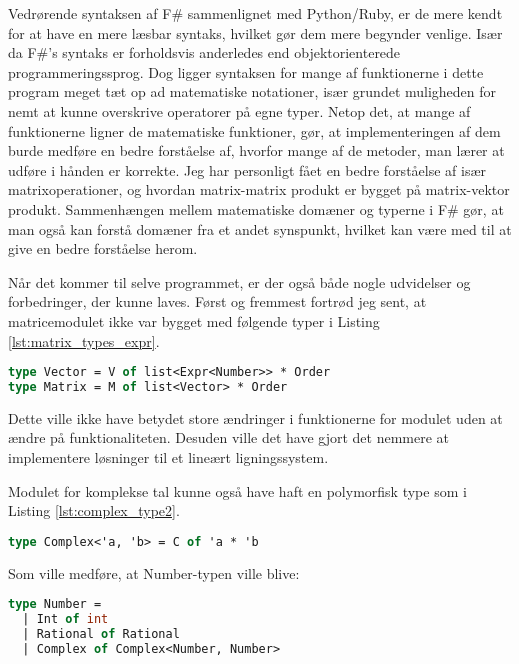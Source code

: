 \documentclass{article}
\begin{document}
Vedrørende syntaksen af F\# sammenlignet med Python/Ruby, er de mere kendt for at have en mere læsbar syntaks, hvilket gør dem mere begynder venlige. Især da F\#'s syntaks er forholdsvis anderledes end objektorienterede programmeringssprog. Dog ligger syntaksen for mange af funktionerne i dette program meget tæt op ad matematiske notationer, især grundet muligheden for nemt at kunne overskrive operatorer på egne typer. Netop det, at mange af funktionerne ligner de matematiske funktioner, gør, at implementeringen af dem burde medføre en bedre forståelse af, hvorfor mange af de metoder, man lærer at udføre i hånden er korrekte. Jeg har personligt fået en bedre forståelse af især matrixoperationer, og hvordan matrix-matrix produkt er bygget på matrix-vektor produkt. Sammenhængen mellem matematiske domæner og typerne i F\# gør, at man også kan forstå domæner fra et andet synspunkt, hvilket kan være med til at give en bedre forståelse herom.

Når det kommer til selve programmet, er der også både nogle udvidelser og forbedringer, der kunne laves. Først og fremmest fortrød jeg sent, at matricemodulet ikke var bygget med følgende typer i Listing \ref{lst:matrix_types_expr}.

\begin{lstlisting}[language={FSharp}, label={lst:matrix_types_expr}, caption={Eksempel på alternative typer for matrixmodulet}]
type Vector = V of list<Expr<Number>> * Order
type Matrix = M of list<Vector> * Order
\end{lstlisting}

Dette ville ikke have betydet store ændringer i funktionerne for modulet uden at ændre på funktionaliteten. Desuden ville det have gjort det nemmere at implementere løsninger til et lineært ligningssystem.

Modulet for komplekse tal kunne også have haft en polymorfisk type som i Listing \ref{lst:complex_type2}.

\begin{lstlisting}[language={FSharp}, label={lst:complex_type2}, caption={Eksempel på alternative typer for komplekse tal modulet}]
type Complex<'a, 'b> = C of 'a * 'b
\end{lstlisting}

Som ville medføre, at Number-typen ville blive:

\begin{lstlisting}[language={FSharp}, label={lst:number_type2}, caption={Eksempel på alternative typer for Number-typen}]
type Number = 
  | Int of int 
  | Rational of Rational 
  | Complex of Complex<Number, Number>
\end{lstlisting}
\end{document}
